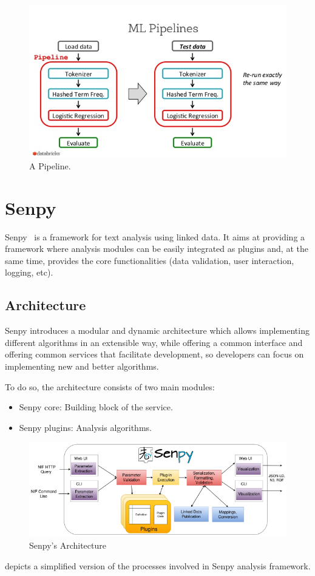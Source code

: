 \begin{figure}
	\includegraphics[width=\linewidth]{img/pipeline1.png}
	\caption{A Pipeline.~\cite{pipeline}}
	\label{fig:pipeline}
\end{figure}

\section{Senpy}
Senpy~\cite{senpy} is a framework for text analysis using linked data. It aims at providing a framework where analysis modules can be easily integrated as plugins and, at the same time, provides the core functionalities (data validation, user interaction, logging, etc).

\subsection{Architecture}
Senpy introduces a modular and dynamic architecture which allows implementing different algorithms in an extensible way, while offering a common interface and offering common services that facilitate development, so developers can focus on implementing new and better algorithms.\par
To do so, the architecture consists of two main modules:
\begin{itemize}
	\item Senpy core: Building block of the service.
	\item Senpy plugins: Analysis algorithms.
\end{itemize}
\begin{figure}
	\includegraphics[width=\linewidth]{img/senpy_architecture.png}
	\caption{Senpy's Architecture~\cite{senpy}}
	\label{fig:senpyarch}
\end{figure}
 depicts a simplified version of the processes involved in Senpy analysis framework.

